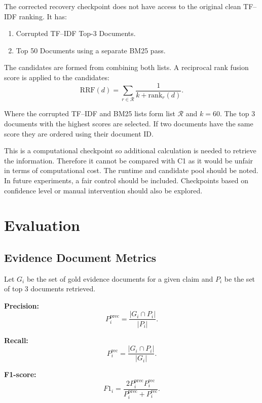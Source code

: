 \documentclass[11pt,a4paper]{article}
\begin{document}
The corrected recovery checkpoint does not have access to the original clean TF--IDF ranking. It has:
\begin{enumerate}[leftmargin=1.5em]
    \item Corrupted TF--IDF Top-3 Documents.
    \item Top 50 Documents using a separate BM25 pass.
\end{enumerate}

The candidates are formed from combining both lists. A reciprocal rank fusion score is applied to the candidates:
\begin{equation}
\mathrm{RRF}(d)=\sum_{r\in\mathcal{R}}\frac{1}{k+\mathrm{rank}_r(d)}.
\end{equation}

Where the corrupted TF--IDF and BM25 lists form list $\mathcal{R}$ and $k=60$. The top 3 documents with the highest scores are selected. If two documents have the same score they are ordered using their document ID.

This is a computational checkpoint so additional calculation is needed to retrieve the information. Therefore it cannot be compared with C1 as it would be unfair in terms of computational cost. The runtime and candidate pool should be noted. In future experiments, a fair control should be included. Checkpoints based on confidence level or manual intervention should also be explored.

\section{Evaluation}

\subsection{Evidence Document Metrics}

Let $G_i$ be the set of gold evidence documents for a given claim and $P_i$ be the set of top 3 documents retrieved.

\textbf{Precision:}
\begin{equation}
P_i^{\mathrm{prec}} = \frac{|G_i\cap P_i|}{|P_i|}.
\end{equation}

\textbf{Recall:}
\begin{equation}
P_i^{\mathrm{rec}} = \frac{|G_i\cap P_i|}{|G_i|}.
\end{equation}

\textbf{F1-score:}
\begin{equation}
F1_i = \frac{2P_i^{\mathrm{prec}}P_i^{\mathrm{rec}}}
{P_i^{\mathrm{prec}} + P_i^{\mathrm{rec}}}.
\end{equation}
\end{document}
